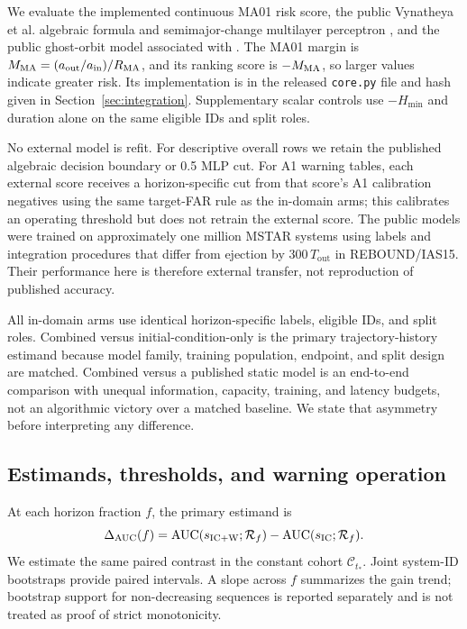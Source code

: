 \documentclass[linenumbers,twocolumn]{aastex702}
\newcommand{\Tout}{T_{\mathrm{out}}}
\begin{document}
We evaluate the implemented continuous MA01 risk score, the public Vynatheya et al. algebraic formula and semimajor-change multilayer perceptron \citep{Vynatheya2022}, and the public ghost-orbit model associated with \citet{Vynatheya2023}. The MA01 margin is $M_{\rm MA}=(a_{\rm out}/a_{\rm in})/R_{\rm MA}$, and its ranking score is $-M_{\rm MA}$, so larger values indicate greater risk. Its implementation is in the released \texttt{core.py} file and hash given in Section~\ref{sec:integration}. Supplementary scalar controls use $-H_{\min}$ and duration alone on the same eligible IDs and split roles.

No external model is refit. For descriptive overall rows we retain the published algebraic decision boundary or 0.5 MLP cut. For A1 warning tables, each external score receives a horizon-specific cut from that score's A1 calibration negatives using the same target-FAR rule as the in-domain arms; this calibrates an operating threshold but does not retrain the external score. The public models were trained on approximately one million MSTAR systems using labels and integration procedures that differ from ejection by $300\,\Tout$ in REBOUND/IAS15. Their performance here is therefore external transfer, not reproduction of published accuracy.

All in-domain arms use identical horizon-specific labels, eligible IDs, and split roles. Combined versus initial-condition-only is the primary trajectory-history estimand because model family, training population, endpoint, and split design are matched. Combined versus a published static model is an end-to-end comparison with unequal information, capacity, training, and latency budgets, not an algorithmic victory over a matched baseline. We state that asymmetry before interpreting any difference.

\subsection{Estimands, thresholds, and warning operation}\label{sec:estimands}

At each horizon fraction $f$, the primary estimand is
\begin{equation}
 \Delta_{\rm AUC}(f)=
 \operatorname{AUC}(s_{\rm IC+W};\mathcal{R}_f)
 -\operatorname{AUC}(s_{\rm IC};\mathcal{R}_f).
\end{equation}
We estimate the same paired contrast in the constant cohort $\mathcal{C}_{t_*}$. Joint system-ID bootstraps provide paired intervals. A slope across $f$ summarizes the gain trend; bootstrap support for non-decreasing sequences is reported separately and is not treated as proof of strict monotonicity.
\end{document}
